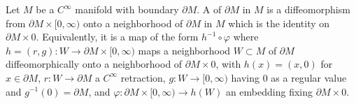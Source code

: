 Let $M$ be a $C^\infty$ manifold with boundary $\partial M$. A  of $\partial M$ in $M$ is a diffeomorphism from $\partial M \times [0,\infty)$ onto a neighborhood of $\partial M$ in $M$ which is the identity on $\partial M \times 0$. Equivalently, it is a map of the form $h^{-1} \circ \varphi$ where $h = (r,g): W \to \partial M \times [0,\infty)$ maps a neighborhood $W \subset M$ of $\partial M$ diffeomorphically onto a neighborhood of $\partial M \times 0$, with $h(x) = (x,0)$ for $x \in \partial M$, $r: W \to \partial M$ a $C^\infty$ retraction, $g: W \to [0,\infty)$ having $0$ as a regular value and $g^{-1}(0) = \partial M$, and $\varphi: \partial M \times [0,\infty) \to h(W)$ an embedding fixing $\partial M \times 0$.
